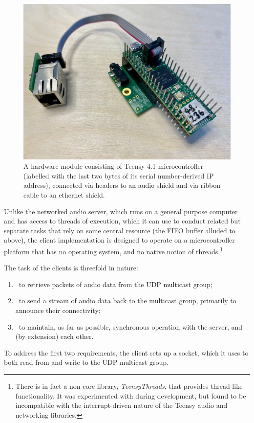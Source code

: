 \begin{figure}[ht]
    \centering
    \includegraphics[width=.75\textwidth]{figures/module}
    \caption{A hardware module consisting of Teensy 4.1 microcontroller
        (labelled with the last two bytes of its serial number-derived IP address),
        connected via headers to an audio shield and via ribbon cable to an
        ethernet shield.}
    \label{fig:teensy}
\end{figure}

Unlike the networked audio server, which runs on a general purpose computer and
has access to threads of execution, which it can use to conduct related but
separate tasks that rely on some central resource (the FIFO buffer alluded to
above), the client implementation is designed to operate on a microcontroller
platform that has no operating system, and no native notion of threads.\footnote{
    There is in fact a non-core library, \textit{TeensyThreads}, that provides
    thread-like functionality. It was experimented with during development,
    but found to be incompatible with the interrupt-driven nature of the
    Teensy audio and networking libraries.
}

The task of the clients is threefold in nature:
\begin{enumerate}
    \item~to retrieve packets of audio data from the UDP multicast group;
    \item~to send a stream of audio data back to the multicast group, primarily
    to announce their connectivity;
    \item~to maintain, as far as possible, synchronous operation with the
    server, and (by extension) each other.
\end{enumerate}

To address the first two requirements, the client sets up a socket, which it
uses to both read from and write to the UDP multicast group.

